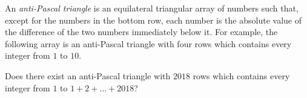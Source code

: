 An \emph{anti-Pascal triangle} is an equilateral triangular array
of numbers such that, except for the numbers in the bottom row,
each number is the absolute value of the difference
of the two numbers immediately below it.
For example, the following array is an anti-Pascal triangle
with four rows which contains every integer from $1$ to $10$.
\begin{center}
\end{center}
Does there exist an anti-Pascal triangle with $2018$ rows
which contains every integer from $1$ to $1+2+\dots +2018$?